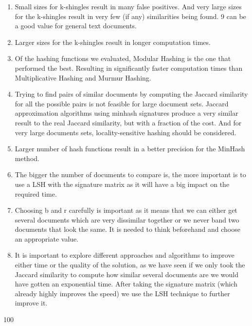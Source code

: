 \documentclass[12pt]{article}
\begin{document}
{\begin{enumerate}
\item Small sizes for k-shingles result in many false positives. And very large sizes for the k-shingles result in very few (if any) similarities being found. 9 can be a good value for general text documents.
\item Larger sizes for the k-shingles result in longer computation times.
\item Of the hashing functions we evaluated, Modular Hashing is the one that performed the best. Resulting in significantly faster computation times than Multiplicative Hashing and Murmur Hashing.
\item Trying to find pairs of similar documents by computing the Jaccard similarity for all the possible pairs is not feasible for large document sets. Jaccard approximation algorithms using minhash signatures produce a very similar result to the real Jaccard similarity, but with a fraction of the cost. And for very large documents sets, locality-sensitive hashing should be considered.
\item Larger number of hash functions result in a better precision for the MinHash method.
\item The bigger the number of documents to compare is, the more important is to use a LSH with the signature matrix as it will have a big impact on the required time.
\item Choosing b and r carefully is important as it means that we can either get several documents which are very dissimilar together or we never band two documents that look the same. It is needed to think beforehand and choose an appropriate value. 
\item It is important to explore different approaches and algorithms to improve either time or the quality of the solution, as we have seen if we only took the Jaccard similarity to compute how similar several documents are we would have gotten an exponential time. After taking the signature matrix (which already highly improves the speed) we use the LSH technique to further improve it.

\end{enumerate}


\clearpage
\begin{thebibliography}{100}


\end{thebibliography}}
\end{document}
